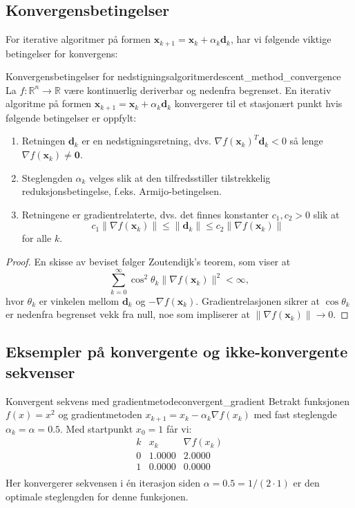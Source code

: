 \subsection{Konvergensbetingelser}

For iterative algoritmer på formen \(\symbf{x}_{k+1} = \symbf{x}_k + \alpha_k \symbf{d}_k\), har vi følgende viktige betingelser for konvergens:

\begin{theorem}{Konvergensbetingelser for nedstigningsalgoritmer}{descent_method_convergence}
	La \(f: \mathbb{R}^n \to \mathbb{R}\) være kontinuerlig deriverbar og nedenfra begrenset. En iterativ algoritme på formen \(\symbf{x}_{k+1} = \symbf{x}_k + \alpha_k \symbf{d}_k\) konvergerer til et stasjonært punkt hvis følgende betingelser er oppfylt:
	\begin{enumerate}
		\item Retningen \(\symbf{d}_k\) er en nedstigningsretning, dvs. \(\nabla f(\symbf{x}_k)^T\symbf{d}_k < 0\) så lenge \(\nabla f(\symbf{x}_k) \neq \symbf{0}\).
		\item Steglengden \(\alpha_k\) velges slik at den tilfredsstiller tilstrekkelig reduksjonsbetingelse, f.eks. Armijo-betingelsen.
		\item Retningene er gradientrelaterte, dvs. det finnes konstanter \(c_1, c_2 > 0\) slik at
		      \[
			      c_1 \|\nabla f(\symbf{x}_k)\| \leq \|\symbf{d}_k\| \leq c_2 \|\nabla f(\symbf{x}_k)\|
		      \]
		      for alle \(k\).
	\end{enumerate}
\end{theorem}

\begin{proof}
	En skisse av beviset følger Zoutendijk's teorem, som viser at
	\[
		\sum_{k=0}^{\infty} \cos^2 \theta_k \|\nabla f(\symbf{x}_k)\|^2 < \infty,
	\]
	hvor \(\theta_k\) er vinkelen mellom \(\symbf{d}_k\) og \(-\nabla f(\symbf{x}_k)\). Gradientrelasjonen sikrer at \(\cos \theta_k\) er nedenfra begrenset vekk fra null, noe som impliserer at \(\|\nabla f(\symbf{x}_k)\| \to 0\).
\end{proof}

\subsection{Eksempler på konvergente og ikke-konvergente sekvenser}

\begin{example}{Konvergent sekvens med gradientmetode}{convergent_gradient}
	Betrakt funksjonen \(f(x) = x^2\) og gradientmetoden \(x_{k+1} = x_k - \alpha_k \nabla f(x_k)\) med fast steglengde \(\alpha_k = \alpha = 0.5\). Med startpunkt \(x_0 = 1\) får vi:
	\[
		\begin{array}{l|l|l}
			k & x_k    & \nabla f(x_k) \\
			\hline
			0 & 1.0000 & 2.0000        \\
			1 & 0.0000 & 0.0000        \\
		\end{array}
	\]
	Her konvergerer sekvensen i én iterasjon siden \(\alpha = 0.5 = 1/(2 \cdot 1)\) er den optimale steglengden for denne funksjonen.
\end{example}

